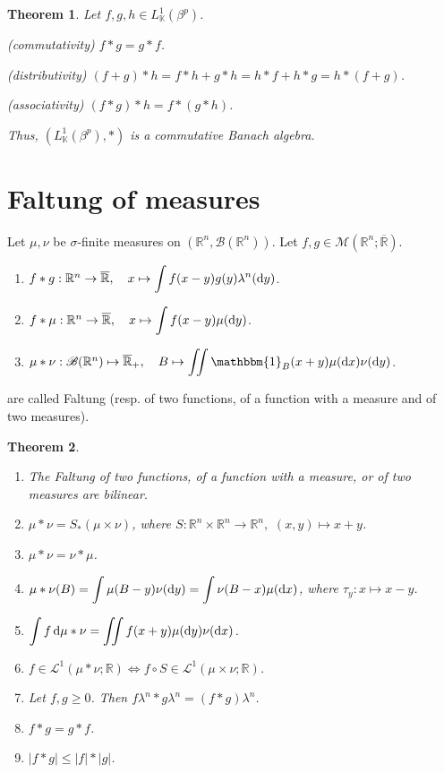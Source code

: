 \documentclass[11pt, a4paper, openany]{book}
\newtheorem{thm}{Theorem}\newtheorem{lem}{Lemma}\newtheorem{crl}{Corollary}
\theoremstyle{definition}
\newenvironment{tight_enumerate}{\begin{enumerate}\itemsep -0.2em}{\end{enumerate}}
\begin{document}
    \begin{thm}
        Let $f,g,h\in L^1_\mathbb{K}(\beta^p)$.
        \begin{tight_enumerate}
            \item (commutativity) $f*g=g*f$.
            \item (distributivity) $(f+g)*h=f*h+g*h=h*f+h*g=h*(f+g)$.
            \item (associativity) $(f*g)*h=f*(g*h)$.
        \end{tight_enumerate}
        Thus, $(L^1_\mathbb{K}(\beta^p),*)$ is a commutative Banach algebra.
    \end{thm}
\section{Faltung of measures}
    Let $\mu,\nu$ be $\sigma$-finite measures on $(\mathbb{R}^n,\mathscr{B}(\mathbb{R}^n))$. Let $f,g\in\mathcal{M}(\mathbb{R}^n;\overline{\mathbb{R}})$.
    \begin{enumerate}
        \itemsep0em
        \item $f*g:\mathbb{R}^n\rightarrow \overline{\mathbb{R}},\quad \displaystyle x\mapsto \int f(x-y)g(y)\lambda^n(\odif y)$.
        \item $f*\mu:\mathbb{R}^n\rightarrow \overline{\mathbb{R}},\quad \displaystyle x\mapsto \int f(x-y)\mu(\odif y)$.
        \item $\mu*\nu:\mathscr{B}(\mathbb{R}^n)\mapsto \overline{\mathbb{R}}_+,\quad B\mapsto \displaystyle \iint \mathbbm{1}_B(x+y)\mu(\odif x)\nu(\odif y)$.
    \end{enumerate}
    are called Faltung (resp. of two functions, of a function with a measure and of two measures).
    \begin{thm}
        \begin{enumerate}
            \itemsep0em
            \item The Faltung of two functions, of a function with a measure, or of two measures are bilinear.
            \item $\mu*\nu=S_*(\mu\times \nu)$, where $S:\mathbb{R}^n\times \mathbb{R}^n\rightarrow \mathbb{R}^n,\,\, (x,y)\mapsto x+y$.
            \item $\mu*\nu=\nu*\mu$.
            \item $\mu*\nu(B)=\displaystyle \int \mu(B-y)\nu(\odif y)=\int \nu(B-x)\mu(\odif x)$, where $\tau_y:x\mapsto x-y$.
            \item $\displaystyle \int f\odif\mu*\nu=\iint f(x+y)\mu(\odif y)\nu(\odif x)$.
            \item $f\in\mathcal{L}^1(\mu*\nu;\mathbb{R})\Longleftrightarrow f\circ S\in \mathcal{L}^1(\mu\times \nu;\mathbb{R})$.
            \item Let $f,g\geqslant 0$. Then $f\lambda^n*g\lambda^n=(f*g)\lambda^n$.
            \item $f*g=g*f$.
            \item $|f*g|\leqslant |f|*|g|$.
        \end{enumerate}
    \end{thm}
\end{document}
